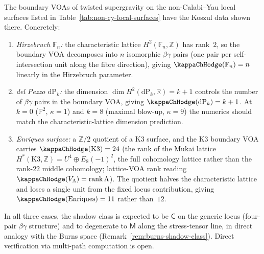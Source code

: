\begin{conjecture}
\label{conj:non-cy-local-surfaces}
The boundary VOAs of twisted supergravity on the non-Calabi--Yau
local surfaces listed in Table~\textup{\ref{tab:non-cy-local-surfaces}}
have the Koszul data shown there. Concretely:
\begin{enumerate}[label=\textup{(\roman*)},nosep]
\item \emph{Hirzebruch $\mathbb{F}_n$:} the characteristic lattice
 $H^{2}(\mathbb{F}_n, \mathbb{Z})$ has rank~$2$, so the boundary
 VOA decomposes into $n$ isomorphic $\beta\gamma$ pairs
 \textup{(}one pair per self-intersection unit along the fibre
 direction\textup{)}, giving
 $\kappaChHodge(\mathbb{F}_n) = n$ linearly in the Hirzebruch parameter.
\item \emph{del Pezzo $\mathrm{dP}_k$:} the dimension
 $\dim H^{2}(\mathrm{dP}_k, \mathbb{R}) = k + 1$ controls the
 number of $\beta\gamma$ pairs in the boundary VOA, giving
 $\kappaChHodge(\mathrm{dP}_k) = k + 1$. At $k = 0$ \textup{(}$\mathbb{P}^2$,
 $\kappa = 1$\textup{)} and $k = 8$ \textup{(}maximal blow-up,
 $\kappa = 9$\textup{)} the numerics should match the
 characteristic-lattice dimension prediction.
\item \emph{Enriques surface:} a $\mathbb{Z}/2$ quotient of a K3 surface,
 and the K3 boundary VOA carries $\kappaChHodge(\mathrm{K3}) = 24$
 \textup{(}the rank of the Mukai lattice
 $H^\ast(\mathrm{K3}, \mathbb{Z}) = U^{4} \oplus E_8(-1)^{2}$, the
 full cohomology lattice rather than the rank-$22$ middle cohomology;
 lattice-VOA rank reading $\kappaChHodge(V_\Lambda) = \mathrm{rank}\,\Lambda$\textup{)}. The
 quotient halves the characteristic lattice and loses a single unit
 from the fixed locus contribution, giving
 $\kappaChHodge(\mathrm{Enriques}) = 11$ rather than~$12$.
\end{enumerate}
In all three cases, the shadow class is expected to be
$\mathsf{C}$ on the generic locus \textup{(}four-pair $\beta\gamma$
structure\textup{)} and to degenerate to $\mathsf{M}$ along the
stress-tensor line, in direct analogy with the Burns space
\textup{(}Remark~\textup{\ref{rem:burns-shadow-class}}\textup{)}.
Direct verification via multi-path computation is open.
\end{conjecture}

